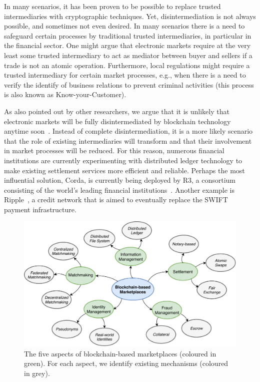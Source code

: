 In many scenarios, it has been proven to be possible to replace trusted intermediaries with cryptographic techniques.
Yet, disintermediation is not always possible, and sometimes not even desired.
In many scenarios there is a need to safeguard certain processes by traditional trusted intermediaries, in particular in the financial sector.
One might argue that electronic markets require at the very least some trusted intermediary to act as mediator between buyer and sellers if a trade is not an atomic operation.
Furthermore, local regulations might require a trusted intermediary for certain market processes, e.g., when there is a need to verify the identify of business relations to prevent criminal activities (this process is also known as Know-your-Customer).

As also pointed out by other researchers, we argue that it is unlikely that electronic markets will be fully disintermediated by blockchain technology anytime soon~\cite{zamani2018little}.
Instead of complete disintermediation, it is a more likely scenario that the role of existing intermediaries will transform and that their involvement in market processes will be reduced.
For this reason, numerous financial institutions are currently experimenting with distributed ledger technology to make existing settlement services more efficient and reliable.
Perhaps the most influential solution, Corda, is currently being deployed by R3, a consortium consisting of the world's leading financial institutions~\cite{brown2016introducing}.
Another example is Ripple~\cite{armknecht2015ripple}, a credit network that is aimed to eventually replace the SWIFT payment infrastructure.

\begin{figure}[t]
	\centering
	\includegraphics[width=\linewidth]{introduction/assets/decomposition}
	\caption{The five aspects of blockchain-based marketplaces (coloured in green). For each aspect, we identify existing mechanisms (coloured in grey).}
	\label{fig:electronic_markets}
\end{figure}


